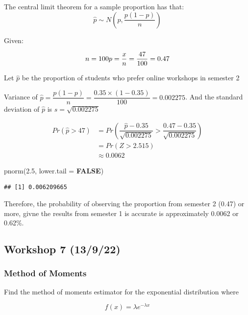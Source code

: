 \documentclass[
]{article}
\newenvironment{Shaded}{\begin{snugshade}}{\end{snugshade}}
\newcommand{\AttributeTok}[1]{\textcolor[rgb]{0.80,0.80,0.80}{#1}}
\newcommand{\ConstantTok}[1]{\textcolor[rgb]{0.86,0.64,0.64}{\textbf{#1}}}
\newcommand{\FloatTok}[1]{\textcolor[rgb]{0.75,0.75,0.82}{#1}}
\newcommand{\FunctionTok}[1]{\textcolor[rgb]{0.94,0.94,0.56}{#1}}
\newcommand{\NormalTok}[1]{\textcolor[rgb]{0.80,0.80,0.80}{#1}}
\begin{document}
The central limit theorem for a sample proportion has that: \[
\hat{p} \sim N\left(p,\dfrac{p(1-p)}{n}\right)
\]

Given:

\[
n = 100\\
p = \dfrac{x}{n} = \dfrac{47}{100}= 0.47\\
\]

Let \(\hat{p}\) be the proportion of students who prefer online
workshops in semester 2

Variance of
\(\hat{p} = \dfrac{p(1-p)}{n}=\dfrac{0.35\times(1-0.35)}{100}=0.002275\).
And the standard deviation of \(\hat{p}\) is \(s = \sqrt{0.002275}\)

\[
\begin{aligned}
Pr(\hat{p} > 47) &= Pr(\dfrac{\hat{p} - 0.35}{\sqrt{0.002275}} > \dfrac{0.47 - 0.35}{\sqrt{0.002275}})\\
&= Pr(Z > 2.515)\\
&\approx 0.0062 
\end{aligned}
\]

\begin{Shaded}
\begin{Highlighting}[]
\FunctionTok{pnorm}\NormalTok{(}\FloatTok{2.5}\NormalTok{, }\AttributeTok{lower.tail =} \ConstantTok{FALSE}\NormalTok{)}
\end{Highlighting}
\end{Shaded}

\begin{verbatim}
## [1] 0.006209665
\end{verbatim}

Therefore, the probability of observing the proportion from semester 2
(0.47) or more, givne the results from semester 1 is accurate is
approximately 0.0062 or 0.62\%.

\hypertarget{workshop-7-13922}{%
\subsection{Workshop 7 (13/9/22)}\label{workshop-7-13922}}

\hypertarget{method-of-moments}{%
\subsubsection{Method of Moments}\label{method-of-moments}}

Find the method of moments estimator for the exponential distribution
where

\[
f(x) = \lambda e^{-\lambda x}
\]
\end{document}
